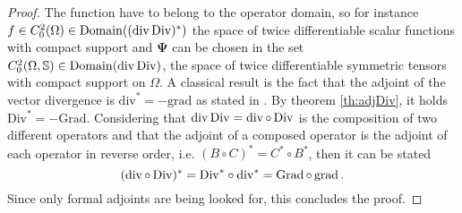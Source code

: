 \begin{theorem}
\begin{proof}
		
		The function have to belong to the operator domain, so for instance $f \in {C}_0^2(\Omega) \in \mathrm{Domain}((\operatorname{div}\operatorname*{Div})^*)$ the space of twice differentiable scalar functions with compact support and $\bm{\Psi}$ can be chosen in the set ${C}_{0}^2(\Omega, \mathbb{S}) \in \mathrm{Domain}(\operatorname{div}\operatorname*{Div})$, the space of twice differentiable symmetric tensors with compact support on $\Omega$. A classical result is the fact that the adjoint of the vector divergence is $\mathrm{div}^* = -\mathrm{grad}$ as stated in \cite{zwart2015wave}. By theorem \ref{th:adjDiv}, it holds $\mathrm{Div}^* = -\mathrm{Grad}$. Considering that $\operatorname{div}\operatorname*{Div} = \operatorname{div} \circ \operatorname*{Div}$ is the composition of two different operators and that the adjoint of a composed operator is the adjoint of each operator in reverse order, i.e. $(B \circ C)^* = C^* \circ B^*$, then it can be stated
		\begin{equation*}
		(\operatorname{div} \circ \operatorname*{Div})^* = {\operatorname*{Div}}^* \circ {\operatorname{div}}^* = \operatorname*{Grad} \circ \operatorname*{grad}.
		\end{equation*}  
		Since only formal adjoints are being looked for, this concludes the proof.
	\end{proof}
\end{theorem}

